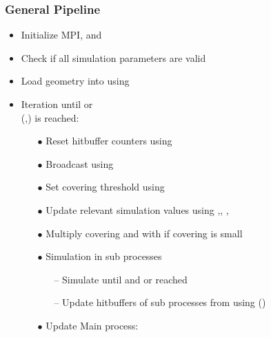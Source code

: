 \subsubsection{General Pipeline}
\begin{itemize}[noitemsep,topsep=0pt, partopsep=0pt]
\item Initialize MPI,  and 
\item Check if all simulation parameters are valid
\item Load geometry into  using 
\item Iteration until  or\\  (,) is reached: \smallskip
	\begin{itemize}[noitemsep,topsep=0pt, partopsep=0pt]
	\item[$\bullet$] Reset hitbuffer counters using 
	\item[$\bullet$] Broadcast  using 
	\item[$\bullet$] Set covering threshold  using 
	\item[$\bullet$] Update relevant simulation values using ,\linebreak[4] , , 
	\item[$\bullet$] Multiply covering and  with  if covering is small
	\item[$\bullet$] Simulation in sub processes
	\begin{itemize}[noitemsep,topsep=0pt, partopsep=0pt]
	\item[--] Simulate until  and  or  reached
	\item[--] Update hitbuffers of sub processes from  using  ()
	\end{itemize}
	\item[$\bullet$] Update Main process:
		\begin{itemize}[noitemsep,topsep=0pt, partopsep=0pt]

\end{itemize}
\end{itemize}
\end{itemize}
